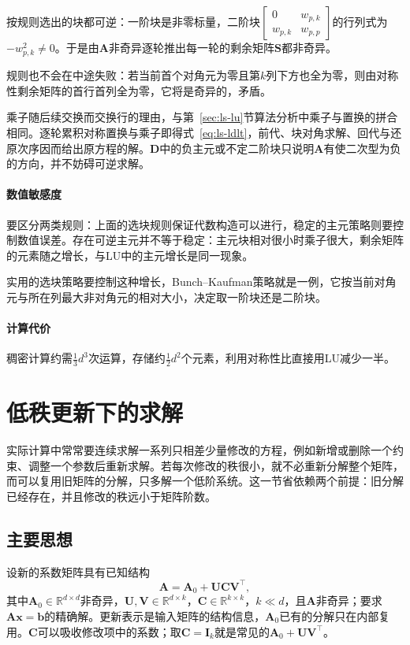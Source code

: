 按规则选出的块都可逆：一阶块是非零标量，二阶块$\left[\begin{smallmatrix}0&w_{p,k}\\w_{p,k}&w_{p,p}\end{smallmatrix}\right]$的行列式为$-w_{p,k}^2\neq0$。于是由$\bm A$非奇异逐轮推出每一轮的剩余矩阵$\bm S$都非奇异。

规则也不会在中途失败：若当前首个对角元为零且第$k$列下方也全为零，则由对称性剩余矩阵的首行首列全为零，它将是奇异的，矛盾。

乘子随后续交换而交换行的理由，与第~\ref{sec:ls-lu}节算法分析中乘子与置换的拼合相同。逐轮累积对称置换与乘子即得式~\eqref{eq:ls-ldlt}，前代、块对角求解、回代与还原次序因而给出原方程的解。$\bm D$中的负主元或不定二阶块只说明$\bm A$有使二次型为负的方向，并不妨碍可逆求解。

\paragraph{数值敏感度}
要区分两类规则：上面的选块规则保证代数构造可以进行，稳定的主元策略则要控制数值误差。存在可逆主元并不等于稳定：主元块相对很小时乘子很大，剩余矩阵的元素随之增长，与LU中的主元增长是同一现象。

实用的选块策略要控制这种增长，Bunch--Kaufman策略就是一例，它按当前对角元与所在列最大非对角元的相对大小，决定取一阶块还是二阶块。

\paragraph{计算代价}
稠密计算约需$\tfrac13d^3$次运算，存储约$\tfrac12d^2$个元素，利用对称性比直接用LU减少一半。

\section{低秩更新下的求解}
\label{sec:ls-woodbury}

实际计算中常常要连续求解一系列只相差少量修改的方程，例如新增或删除一个约束、调整一个参数后重新求解。若每次修改的秩很小，就不必重新分解整个矩阵，而可以复用旧矩阵的分解，只多解一个低阶系统。这一节省依赖两个前提：旧分解已经存在，并且修改的秩远小于矩阵阶数。

\subsection{主要思想}
设新的系数矩阵具有已知结构
\begin{equation}
 \bm A=\bm A_0+\bm U\bm C\bm V^\top,
 \label{eq:ls-woodbury-update-structure}
\end{equation}
其中$\bm A_0\in\mathbb R^{d\times d}$非奇异，$\bm U,\bm V\in\mathbb R^{d\times k}$，$\bm C\in\mathbb R^{k\times k}$，$k\ll d$，且$\bm A$非奇异；要求$\bm A\bm x=\bm b$的精确解。更新表示是输入矩阵的结构信息，$\bm A_0$已有的分解只在内部复用。$\bm C$可以吸收修改项中的系数；取$\bm C=\bm I_k$就是常见的$\bm A_0+\bm U\bm V^\top$。


